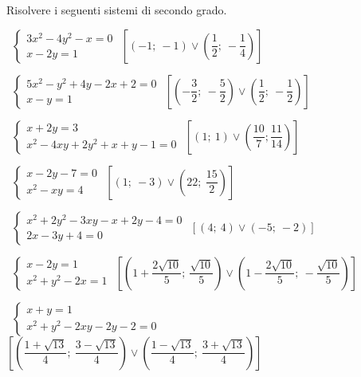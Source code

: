 \begin{esercizio}[\Ast]
 \label{ese:6.7}
Risolvere i seguenti sistemi di secondo grado.
 \begin{enumeratea}
 \item~$\left\{\begin{array}{l}3x^2-4y^2-x=0\\x-2y=1\end{array}\right.$
\hfill$\left[\left(-1;~-1\right)\vee \left(\dfrac 1 2;~-\dfrac 1 
4\right)\right]$
 \item~$\left\{\begin{array}{l}5x^2-y^2+4y-2x+2=0\\x-y=1\end{array}\right.$
\hfill$\left[\left(-\dfrac 3 2;~-\dfrac 5 2\right) \vee 
       \left(\dfrac 1 2;~-\dfrac 1 2\right)\right]$
 
\item~$\left\{\begin{array}{l}x+2y=3\\x^2-4xy+2y^2+x+y-1=0\end{array}
\right.$
\hfill$\left[\left(1;~1\right)\vee \left(\dfrac{10} 7;
    \dfrac{11}{14}\right)\right]$
 \item~$\left\{\begin{array}{l}x-2y-7=0\\x^2-xy=4\end{array}\right.$
\hfill$\left[\left(1;~-3\right)\vee \left(22;~\dfrac{15}{2}\right)\right]$
\item~$\left\{\begin{array}{l}x^2+2y^2-3xy-x+2y-4=0\\2x-3y+4=0\end{array}
\right.$
\hfill$\left[\left(4;~4\right)\vee \left(-5;~-2\right)\right]$
 \item~$\left\{\begin{array}{l}x-2y=1\\x^2+y^2-2x=1\end{array}\right.$
\hfill$\left[\left(1+\dfrac{2\sqrt{10}} 5;~\dfrac{\sqrt{10}} 5\right)\vee 
\left(1-\dfrac{2\sqrt{10}} 5;~-\dfrac{\sqrt{10}} 5\right)\right]$
 \item~$\left\{\begin{array}{l}x+y=1\\x^2+y^2-2xy-2y-2=0\end{array}\right.$
\hfill$\left[\left(\dfrac{1+\sqrt{13}} 4;~\dfrac{3-\sqrt{13}} 4\right)\vee 
\left(\dfrac{1-\sqrt{13}} 4;~\dfrac{3+\sqrt{13}} 4\right)\right]$
 

\end{enumeratea}
\end{esercizio}
